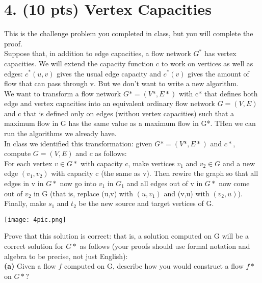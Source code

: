 \documentclass[12pt]{article}
\begin{document}
\section*{4. (10 pts) Vertex Capacities}
This is the challenge problem you completed in class, but you will complete the proof. \\
\linebreak
Suppose that, in addition to edge capacities, a flow network $G^*$ has vertex capacities. We will extend the capacity function c to work on vertices as well as edges: $c^*(u,v)$ gives the usual edge capacity and $c^*(v)$ gives the amount of flow that can pass through v. But we don't want to write a new algorithm. \\
\linebreak
We want to transform a flow network $G* = (V*,E*)$ with c* that defines both edge and vertex capacities into an equivalent ordinary flow network $G=(V,E)$ and c that is defined only on edges (withou vertex capacities) such that a maximum flow in G has the same value as a maximum flow in G*. THen we can run the algorithms we already have. \\
\linebreak
In class we identified this transformation: given $G* = (V*,E*)$ and $c*$, compute $G = (V,E)$ and $c$ as follows: \\
\linebreak
 For each vertex $v \in G*$ with capacity c, make vertices $v_1$ and $v_2 \in G$ and a new edge $(v_1,v_2)$ with capacity c (the same as v). Then rewire the graph so that all edges in v in $G*$  now go into $v_1$ in $G_1$ and all edges out of v in $G*$
 now come out of $v_2$ in G (that is, replace (u,v) with $(u,v_1)$ and (v,u) with $(v_2, u)$). Finally, make $s_1$ and $t_2$ be the new source and target vertices of G. \\
 \linebreak
 \begin{center}
 \texttt{[image: 4pic.png]}\\
 \end{center}
 Prove that this solution is correct: that is, a solution computed on G will be a correct solution for $G*$ as follows (your proofs should use formal notation and algebra to be precise, not just English): \\
 \linebreak
 \textbf{(a)} Given a flow $f$ computed on G, describe how you would construct a flow $f*$ on $G*$? \\
 \linebreak
\end{document}
